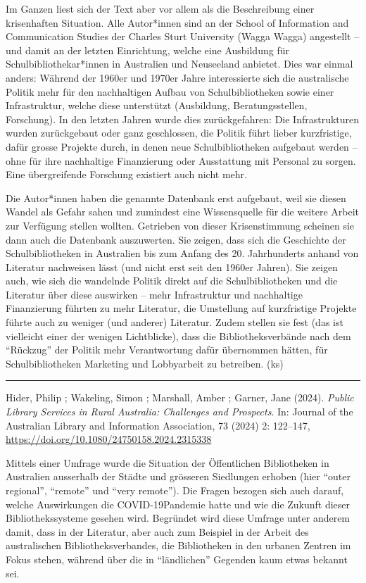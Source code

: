 \documentclass[a4paper,
fontsize=11pt,
oneside,
numbers=noperiodatend,
parskip=half-,
bibliography=totoc,
final
]{scrartcl}
\begin{document}
Im Ganzen liest sich der Text aber vor allem als die Beschreibung einer
krisenhaften Situation. Alle Autor*innen sind an der School of
Information and Communication Studies der Charles Sturt University
(Wagga Wagga) angestellt -- und damit an der letzten Einrichtung, welche
eine Ausbildung für Schulbibliothekar*innen in Australien und Neuseeland
anbietet. Dies war einmal anders: Während der 1960er und 1970er Jahre
interessierte sich die australische Politik mehr für den nachhaltigen
Aufbau von Schulbibliotheken sowie einer Infrastruktur, welche diese
unterstützt (Ausbildung, Beratungsstellen, Forschung). In den letzten
Jahren wurde dies zurückgefahren: Die Infrastrukturen wurden
zurückgebaut oder ganz geschlossen, die Politik führt lieber
kurzfristige, dafür grosse Projekte durch, in denen neue
Schulbibliotheken aufgebaut werden -- ohne für ihre nachhaltige
Finanzierung oder Ausstattung mit Personal zu sorgen. Eine übergreifende
Forschung existiert auch nicht mehr.

Die Autor*innen haben die genannte Datenbank erst aufgebaut, weil sie
diesen Wandel als Gefahr sahen und zumindest eine Wissensquelle für die
weitere Arbeit zur Verfügung stellen wollten. Getrieben von dieser
Krisenstimmung scheinen sie dann auch die Datenbank auszuwerten. Sie
zeigen, dass sich die Geschichte der Schulbibliotheken in Australien bis
zum Anfang des 20. Jahrhunderts anhand von Literatur nachweisen lässt
(und nicht erst seit den 1960er Jahren). Sie zeigen auch, wie sich die
wandelnde Politik direkt auf die Schulbibliotheken und die Literatur
über diese auswirken -- mehr Infrastruktur und nachhaltige Finanzierung
führten zu mehr Literatur, die Umstellung auf kurzfristige Projekte
führte auch zu weniger (und anderer) Literatur. Zudem stellen sie fest
(das ist vielleicht einer der wenigen Lichtblicke), dass die
Bibliotheksverbände nach dem ``Rückzug'' der Politik mehr Verantwortung
dafür übernommen hätten, für Schulbibliotheken Marketing und Lobbyarbeit
zu betreiben. (ks)

\begin{center}\rule{0.5\linewidth}{0.5pt}\end{center}

Hider, Philip ; Wakeling, Simon ; Marshall, Amber ; Garner, Jane (2024).
\emph{Public Library Services in Rural Australia: Challenges and
Prospects}. In: Journal of the Australian Library and Information
Association, 73 (2024) 2: 122--147,
\url{https://doi.org/10.1080/24750158.2024.2315338}

Mittels einer Umfrage wurde die Situation der Öffentlichen Bibliotheken
in Australien ausserhalb der Städte und grösseren Siedlungen erhoben
(hier ``outer regional'', ``remote'' und ``very remote''). Die Fragen
bezogen sich auch darauf, welche Auswirkungen die COVID-19Pandemie hatte
und wie die Zukunft dieser Bibliothekssysteme gesehen wird. Begründet
wird diese Umfrage unter anderem damit, dass in der Literatur, aber auch
zum Beispiel in der Arbeit des australischen Bibliotheksverbandes, die
Bibliotheken in den urbanen Zentren im Fokus stehen, während über die in
``ländlichen'' Gegenden kaum etwas bekannt sei.
\end{document}
